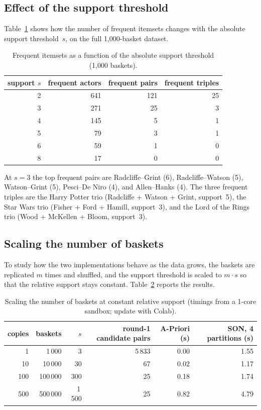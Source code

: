 \documentclass[11pt,a4paper]{article}
\begin{document}
\subsection{Effect of the support threshold}

Table~\ref{tab:threshold} shows how the number of frequent itemsets changes with the absolute support
threshold~$s$, on the full 1,000-basket dataset.

\begin{table}[h]\centering
\begin{tabular}{rrrr}\toprule
support $s$ & frequent actors & frequent pairs & frequent triples\\\midrule
2 & 641 & 121 & 25\\
3 & 271 & 25 & 3\\
4 & 145 & 5 & 1\\
5 & 79 & 3 & 1\\
6 & 59 & 1 & 0\\
8 & 17 & 0 & 0\\\bottomrule
\end{tabular}
\caption{Frequent itemsets as a function of the absolute support threshold (1,000 baskets).}
\label{tab:threshold}
\end{table}

At $s = 3$ the top frequent pairs are Radcliffe--Grint (6), Radcliffe--Watson (5), Watson--Grint (5),
Pesci--De Niro (4), and Allen--Hanks (4). The three frequent triples are the Harry Potter trio
(Radcliffe + Watson + Grint, support~5), the Star Wars trio (Fisher + Ford + Hamill, support~3),
and the Lord of the Rings trio (Wood + McKellen + Bloom, support~3).

\subsection{Scaling the number of baskets}

To study how the two implementations behave as the data grows, the baskets are replicated $m$ times and
shuffled, and the support threshold is scaled to $m \cdot s$ so that the relative support stays constant.
Table~\ref{tab:scaling} reports the results.

\begin{table}[h]\centering
\begin{tabular}{rrrrrr}\toprule
copies & baskets & $s$ & round-1 candidate pairs & A-Priori (s) & SON, 4 partitions (s)\\\midrule
1 & 1\,000 & 3 & 5\,833 & 0.00 & 1.55\\
10 & 10\,000 & 30 & 67 & 0.02 & 1.17\\
100 & 100\,000 & 300 & 25 & 0.18 & 1.74\\
500 & 500\,000 & 1\,500 & 25 & 0.82 & 4.79\\\bottomrule
\end{tabular}
\caption{Scaling the number of baskets at constant relative support (timings from a 1-core sandbox; update with Colab).}
\label{tab:scaling}
\end{table}
\end{document}
